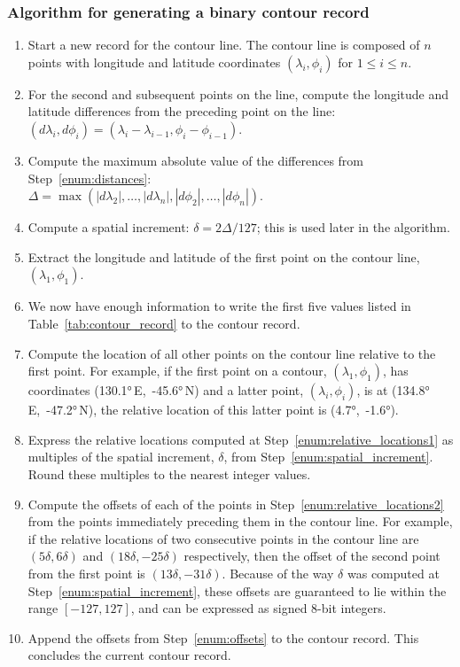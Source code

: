 \documentclass[12pt,a4paper]{article}
\begin{document}
\begin{tcolorbox}[width=\textwidth, colback={lightgray}]
\subsubsection*{Algorithm for generating a binary contour record}
\begin{enumerate}
\item \label{enum:max_distance} Start a new record for
the contour line. The contour line is composed of $n$ points
with longitude and latitude coordinates $(\lambda_i, \phi_i)$ for
$1\leq i\leq n$.
\item \label{enum:distances} For the second and subsequent points on the line,
compute the longitude and latitude differences from the
preceding point on the line:\\
$(d\lambda_i, d\phi_i) = (\lambda_i-\lambda_{i-1}, \phi_i-\phi_{i-1})$.
\item Compute the maximum
absolute value of the differences from Step~\ref{enum:distances}:\\
$\Delta = \max(|d\lambda_2|, \ldots, |d\lambda_n|, |d\phi_2|, \ldots, |d\phi_n|)$.
\item \label{enum:spatial_increment} Compute a spatial increment:
$\delta = 2\Delta/127$; this is used later in the algorithm.
\item Extract the longitude and latitude of the first point on the contour
line, $(\lambda_1, \phi_1)$.
\item We now have enough information to write the first five values listed in
Table~\ref{tab:contour_record} to the contour record.
\item \label{enum:relative_locations1} Compute the location of all other points
on the contour line relative to the first point. For example, if the first
point on a contour, $(\lambda_1, \phi_1)$, has coordinates
(\ang{130.1}\,E,~\ang{-45.6}\,N) and a latter point, $(\lambda_i, \phi_i)$, is
at (\ang{134.8}\,E,~\ang{-47.2}\,N), the relative location of this latter point
is (\ang{4.7},~\ang{-1.6}).
\item \label{enum:relative_locations2} Express the relative locations computed
at Step~\ref{enum:relative_locations1} as multiples of the spatial increment,
$\delta$, from Step~\ref{enum:spatial_increment}. Round these multiples to
the nearest integer values.
\item \label{enum:offsets} Compute the offsets of each of the points in
Step~\ref{enum:relative_locations2} from the points immediately preceding them
in the contour line. For example, if the relative locations of two consecutive
points in the contour line are $(5\delta, 6\delta)$ and $(18\delta, -25\delta)$
respectively, then the offset of the second point from the first point is
$(13\delta, -31\delta)$. Because of the way $\delta$ was computed at
Step~\ref{enum:spatial_increment}, these offsets are guaranteed to lie within
the range $[-127,127]$, and can be expressed as signed 8-bit integers.
\item Append the offsets from Step~\ref{enum:offsets} to the contour record.
This concludes the current contour record.
\end{enumerate}
\end{tcolorbox}
\end{document}
